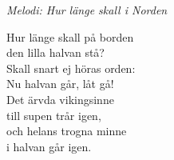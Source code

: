 {\footnotesize\textit{Melodi: Hur länge skall i Norden}}\par
\vspace{10pt}
\revrpt Hur länge skall på borden \\
den lilla halvan stå? \\
Skall snart ej höras orden: \\
Nu halvan går, låt gå! \rpt \\
\revrpt Det ärvda vikingsinne \\
till supen trår igen, \\
och helans trogna minne \\
i halvan går igen. \rpt
